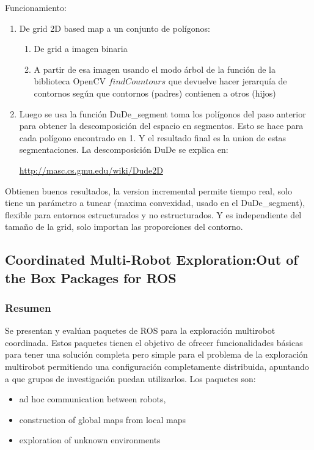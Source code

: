 Funcionamiento:
\begin{enumerate}
  \item De grid 2D based map a un conjunto de polígonos:
  \begin{enumerate}
     \item De grid a imagen binaria
     \item A partir de esa imagen usando el modo árbol de la función de la biblioteca OpenCV $findCountours$ que devuelve hacer jerarquía de contornos según que contornos (padres) contienen a otros (hijos)
  \end{enumerate}
\item Luego se usa la función DuDe\_segment toma los polígonos del paso anterior para obtener la descomposición del espacio en segmentos. Esto se hace para cada polígono encontrado en 1. Y el resultado final es la union de estas segmentaciones. La descomposición DuDe se explica en: 

  \url{http://masc.cs.gmu.edu/wiki/Dude2D}
\end{enumerate}

Obtienen buenos resultados, la version incremental permite tiempo real, solo tiene un parámetro a tunear (maxima convexidad, usado en el DuDe\_segment), flexible para entornos estructurados y no estructurados. Y es independiente del tamaño de la grid, solo importan las proporciones del contorno.

\subsection{Coordinated Multi-Robot Exploration:Out of the Box Packages for ROS}
\subsubsection{Resumen}
Se presentan y evalúan paquetes de ROS para la exploración multirobot coordinada. Estos paquetes tienen el objetivo de ofrecer funcionalidades básicas para tener una solución completa pero simple para el problema de la exploración multirobot permitiendo una configuración completamente distribuida, apuntando a que grupos de investigación puedan utilizarlos. Los paquetes son:
\begin{itemize}
  \item ad hoc communication between robots,
  \item construction of global maps from local maps
  \item exploration of unknown environments
\end{itemize}

